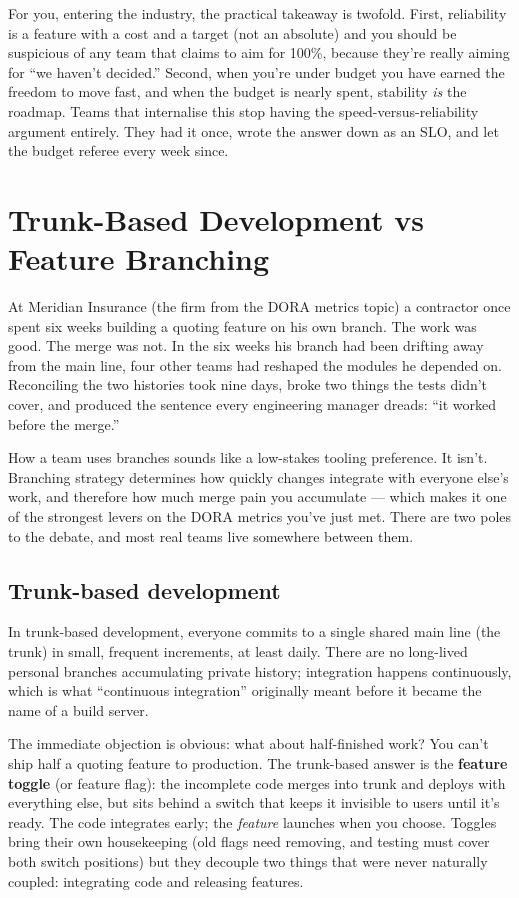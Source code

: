 For you, entering the industry, the practical takeaway is twofold. First, reliability is a feature with a cost and a target (not an absolute) and you should be suspicious of any team that claims to aim for 100\%, because they're really aiming for ``we haven't decided.'' Second, when you're under budget you have earned the freedom to move fast, and when the budget is nearly spent, stability \emph{is} the roadmap. Teams that internalise this stop having the speed-versus-reliability argument entirely. They had it once, wrote the answer down as an SLO, and let the budget referee every week since.

\section{Trunk-Based Development vs Feature Branching}
At Meridian Insurance (the firm from the DORA metrics topic) a contractor once spent six weeks building a quoting feature on his own branch. The work was good. The merge was not. In the six weeks his branch had been drifting away from the main line, four other teams had reshaped the modules he depended on. Reconciling the two histories took nine days, broke two things the tests didn't cover, and produced the sentence every engineering manager dreads: ``it worked before the merge.''


How a team uses branches sounds like a low-stakes tooling preference. It isn't. Branching strategy determines how quickly changes integrate with everyone else's work, and therefore how much merge pain you accumulate — which makes it one of the strongest levers on the DORA metrics you've just met. There are two poles to the debate, and most real teams live somewhere between them.



\subsection{Trunk-based development}


In trunk-based development, everyone commits to a single shared main line (the trunk) in small, frequent increments, at least daily. There are no long-lived personal branches accumulating private history; integration happens continuously, which is what ``continuous integration'' originally meant before it became the name of a build server.


The immediate objection is obvious: what about half-finished work? You can't ship half a quoting feature to production. The trunk-based answer is the \textbf{feature toggle} (or feature flag): the incomplete code merges into trunk and deploys with everything else, but sits behind a switch that keeps it invisible to users until it's ready. The code integrates early; the \emph{feature} launches when you choose. Toggles bring their own housekeeping (old flags need removing, and testing must cover both switch positions) but they decouple two things that were never naturally coupled: integrating code and releasing features.


